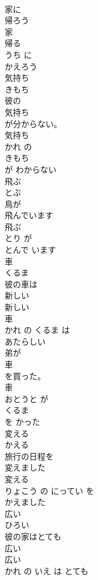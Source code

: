 \documentclass[8pt]{extreport}
\begin{document}
\begin{CJK}{UTF8}{min}
\\	家に
\\	帰ろう
\\	家 
\\	帰る 
\\	うち に 
\\	かえろう
\\	気持ち	
\\	きもち	
\\	彼の
\\	気持ち
\\	が分からない。	
\\	気持ち 
\\	かれ の 
\\	きもち
\\	が わからない	
\\	飛ぶ	
\\	とぶ	
\\	鳥が
\\	飛んでいます
\\	飛ぶ 
\\	とり が 
\\	とんで います
\\	車	
\\	くるま	
\\	彼の車は
\\	新しい
\\	新しい 
\\	車 
\\	かれ の くるま は 
\\	あたらしい
\\	弟が
\\	車
\\	を買った。	
\\	車 
\\	おとうと が 
\\	くるま
\\	を かった	
\\	変える	
\\	かえる	
\\	旅行の日程を
\\	変えました
\\	変える 
\\	りょこう の にってい を 
\\	かえました
\\	広い	
\\	ひろい	
\\	彼の家はとても
\\	広い
\\	広い 
\\	かれ の いえ は とても 

\end{CJK}
\end{document}
